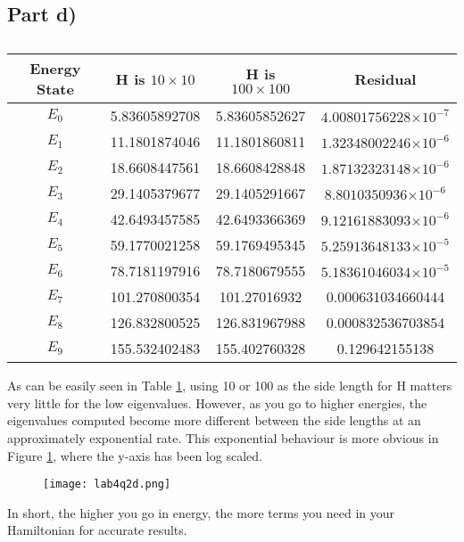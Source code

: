 \documentclass[a4paper,12pt]{article}
\providecommand{\e}[1]{\ensuremath{\times 10^{#1}}}
\begin{document}
\subsection{Part d)}

\begin{table}[H]
  \centering
  \begin{tabular}{|c||c||c||c|}
  \hline
  Energy State & H is $10 \times 10$ & H is $100 \times 100$ & Residual\\
  \hline
  \hline
   $E_0$ & 5.83605892708 & 5.83605852627 & $4.00801756228\e{-7}$\\
	\hline
	 $E_1$ & 11.1801874046 & 11.1801860811 & $1.32348002246\e{-6}$\\
	\hline
	 $E_2$ & 18.6608447561 & 18.6608428848 & $1.87132323148\e{-6}$\\
	\hline
	 $E_3$ & 29.1405379677 & 29.1405291667 & $8.8010350936\e{-6}$\\
	\hline
	 $E_4$ & 42.6493457585 & 42.6493366369 & $9.12161883093\e{-6}$\\
	\hline
	 $E_5$ & 59.1770021258 & 59.1769495345 & $5.25913648133\e{-5}$\\
	\hline
	 $E_6$ & 78.7181197916 & 78.7180679555 & $5.18361046034\e{-5}$\\
	\hline
	 $E_7$ & 101.270800354 & 101.27016932 & 0.000631034660444\\
	\hline
	 $E_8$ & 126.832800525 & 126.831967988 & 0.000832536703854\\
	\hline
	 $E_9$ & 155.532402483 & 155.402760328 & 0.129642155138\\
	\hline
  \end{tabular}
  \caption{}
\label{tab:energy}
\end{table}

As can be easily seen in Table \ref{tab:energy}, using 10 or 100 as the side length for H matters very little for the low eigenvalues. However, as you go to higher energies, the eigenvalues computed become more different between the side lengths at an approximately exponential rate. This exponential behaviour is more obvious in Figure \ref{fig:q2d}, where the y-axis has been log scaled.

\begin{figure}[H]
\centering
\texttt{[image: lab4q2d.png]}
\caption{}
\label{fig:q2d}
\end{figure}

In short, the higher you go in energy, the more terms you need in your Hamiltonian for accurate results.
\end{document}
